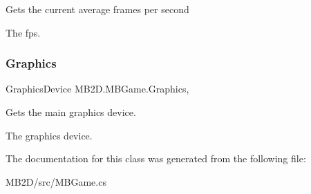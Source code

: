 Gets the current average frames per second 

The fps.\hypertarget{class_m_b2_d_1_1_m_b_game_ab46479cca47c2d5da6528ef81e9ff7c1}{}\label{class_m_b2_d_1_1_m_b_game_ab46479cca47c2d5da6528ef81e9ff7c1} 
\subsubsection{\texorpdfstring{Graphics}{Graphics}}
{\footnotesize\ttfamily Graphics\+Device M\+B2\+D.\+M\+B\+Game.\+Graphics\hspace{0.3cm}{\ttfamily [static]}, {\ttfamily [get]}}



Gets the main graphics device. 

The graphics device.

The documentation for this class was generated from the following file\+:\begin{DoxyCompactItemize}
\item 
M\+B2\+D/src/M\+B\+Game.\+cs\end{DoxyCompactItemize}
